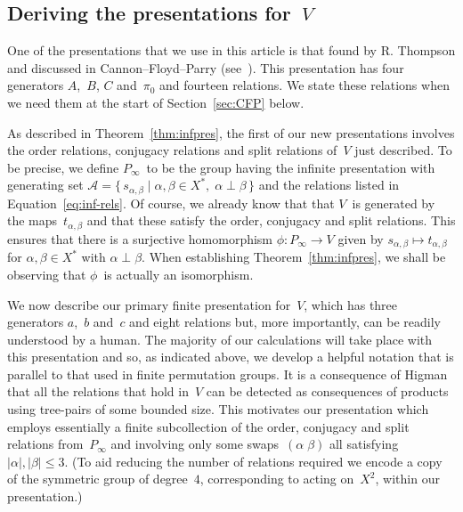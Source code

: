 \documentclass[a4paper,11pt]{article}
\numberwithin{equation}{section}
\newcommand{\A}{\mathcal{A}}
\newcommand{\length}[1]{\mathopen{|}#1\mathclose{|}}
\newcommand{\set}[2]{\{\,#1\mid#2\,\}}
\newcommand{\spc}{\vspace{\baselineskip}}
\newcommand{\swap}[2]{(#1\;#2)}
\renewcommand{\leq}{\leqslant}
\begin{document}
\subsection{\boldmath Deriving the presentations for~$V$}

One of the presentations that we use in this article is that found by
R. Thompson and discussed in Cannon--Floyd--Parry
(see~\cite[Lemma~6.1]{CFP}).  This presentation has four generators
$A$,~$B$, $C$ and~$\pi_{0}$ and fourteen relations.  We state these
relations when we need them at the start of Section~\ref{sec:CFP}
below.

As described in Theorem~\ref{thm:infpres}, the first of our new
presentations involves the order relations, conjugacy relations and
split relations of~$V$ just described.  To be precise, we define
$P_{\infty}$~to be the group having the infinite presentation with
generating set $\A = \set{s_{\alpha,\beta}}{\alpha,\beta \in X^{\ast},
  \; \alpha \perp \beta}$ and the relations listed in
Equation~\eqref{eq:inf-rels}.  Of course, we already know that that
$V$~is generated by the maps~$t_{\alpha,\beta}$ and that these satisfy
the order, conjugacy and split relations.  This ensures that there is
a surjective homomorphism $\phi \colon P_{\infty} \to V$ given by
$s_{\alpha,\beta} \mapsto t_{\alpha,\beta}$ for $\alpha,\beta \in
X^{\ast}$ with $\alpha \perp \beta$.  When establishing
Theorem~\ref{thm:infpres}, we shall be observing that $\phi$~is
actually an isomorphism.

\spc

We now describe our primary finite presentation for~$V$, which has
three generators $a$,~$b$ and~$c$ and eight relations but, more
importantly, can be readily understood by a human.  The majority of
our calculations will take place with this presentation and so, as
indicated above, we develop a helpful notation that is parallel to
that used in finite permutation groups.  It is a consequence of
Higman~\cite{Higman} that all the relations that hold in~$V$ can be
detected as consequences of products using tree-pairs of some bounded
size.  This motivates our presentation which employs essentially a
finite subcollection of the order, conjugacy and split relations
from~$P_{\infty}$ and involving only some swaps~$\swap{\alpha}{\beta}$
all satisfying $\length{\alpha},\length{\beta} \leq 3$.  (To aid
reducing the number of relations required we encode a copy of the
symmetric group of degree~$4$, corresponding to acting on~$X^{2}$,
within our presentation.)
\end{document}
